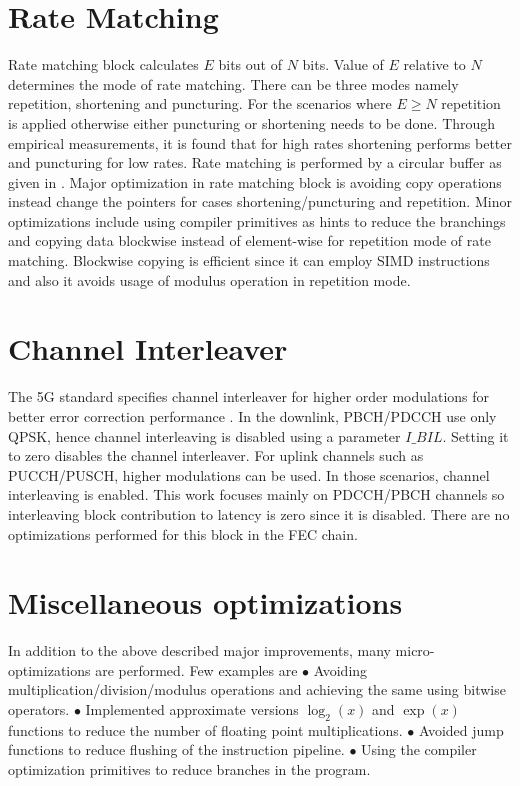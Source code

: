 \section{Rate Matching}
Rate matching block calculates $E$ bits out of $N$ bits. Value of $E$ relative to $N$ determines the mode of rate matching. There can be three modes namely repetition, shortening and puncturing. For the scenarios where $E \geq N$ repetition is applied otherwise either puncturing or shortening needs to be done. Through empirical measurements, it is found that for high rates shortening performs better and puncturing for low rates. Rate matching is performed by a circular buffer as given in \cite{DesignOfPolarCodes5G}. Major optimization in rate matching block is avoiding copy operations instead change the pointers for cases shortening/puncturing and repetition. Minor optimizations include using compiler primitives as hints to reduce the branchings and copying data blockwise instead of element-wise for repetition mode of rate matching. Blockwise copying is efficient since it can employ SIMD instructions and also it avoids usage of modulus operation in repetition mode.

\section{Channel Interleaver}
The 5G standard specifies channel interleaver for higher order modulations for better error correction performance \cite{3gpp.TSG-RAN_WG1}. In the downlink, PBCH/PDCCH use only QPSK, hence channel interleaving is disabled using a parameter $I\_BIL$. Setting it to zero disables the channel interleaver. For uplink channels such as PUCCH/PUSCH, higher modulations can be used. In those scenarios, channel interleaving is enabled. This work focuses mainly on PDCCH/PBCH channels so interleaving block contribution to latency is zero since it is disabled. There are no optimizations performed for this block in the FEC chain.

\section{Miscellaneous optimizations}
In addition to the above described major improvements, many micro-optimizations are performed. Few examples are \newline
$\bullet $ Avoiding multiplication/division/modulus operations and achieving the same using bitwise operators.\newline
$\bullet $ Implemented approximate versions $\log_2{(x)}$ and $\exp{(x)}$ functions to reduce the number of floating point multiplications.\newline
$\bullet $ Avoided jump functions to reduce flushing of the instruction pipeline.\newline
$\bullet $ Using the compiler optimization primitives to reduce branches in the program.\newline

